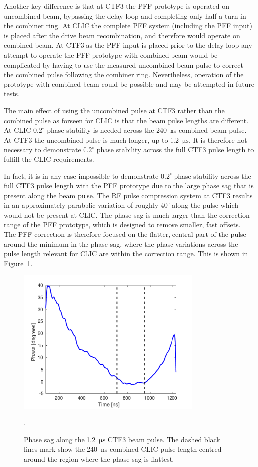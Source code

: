 Another key difference is that at CTF3 the PFF prototype is operated on uncombined beam, bypassing the delay loop and completing only half a turn in the combiner ring. At CLIC the complete PFF system (including the PFF input) is placed after the drive beam recombination, and therefore would operate on combined beam. At CTF3 as the PFF input is placed prior to the delay loop any attempt to operate the PFF prototype with combined beam would be complicated by having to use the measured uncombined beam pulse to correct the combined pulse following the combiner ring. Nevertheless, operation of the prototype with combined beam could be possible and may be attempted in future tests.

The main effect of using the uncombined pulse at CTF3 rather than the combined pulse as forseen for CLIC is that the beam pulse lengths are different. At CLIC \(0.2^\circ\) phase stability is needed across the 240~ns combined beam pulse. At CTF3 the uncombined pulse is much longer, up to 1.2~\(\mathrm{\mu s}\). It is therefore not necessary to demonstrate \(0.2^\circ\) phase stability across the full CTF3 pulse length to fulfill the CLIC requirements.

In fact, it is in any case impossible to demonstrate \(0.2^\circ\) phase stability across the full CTF3 pulse length with the PFF prototype due to the large phase sag that is present along the beam pulse. The RF pulse compression system at CTF3 \cite{rfCompress} results in an approximately parabolic variation of roughly \(40^\circ\) along the pulse which would not be present at CLIC. The phase sag is much larger than the correction range of the PFF prototype, which is designed to remove smaller, fast offsets. The PFF correction is therefore focused on the flatter, central part of the pulse around the minimum in the phase sag, where the phase variations across the pulse length relevant for CLIC are within the correction range. This is shown in Figure~\ref{f:ctfPhaseSag}.

\begin{figure}
  \centering
  \includegraphics[width=0.8\textwidth]{Figures/introduction/phaseSag}
  \caption{Phase sag along the 1.2~\(\mathrm{\mu s}\) CTF3 beam pulse. The dashed black lines mark show the 240~ns combined CLIC pulse length centred around the region where the phase sag is flattest.}.
  \label{f:ctfPhaseSag}
\end{figure}

